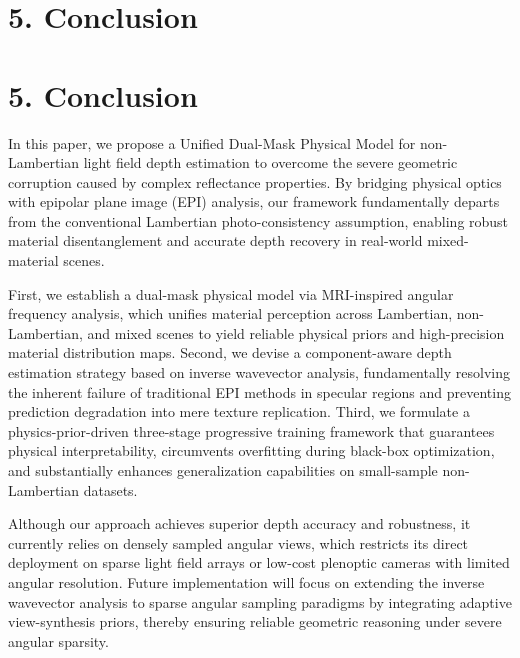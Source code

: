 \section{5. Conclusion}

\section{5. Conclusion}

In this paper, we propose a Unified Dual-Mask Physical Model for non-Lambertian light field depth estimation to overcome the severe geometric corruption caused by complex reflectance properties. By bridging physical optics with epipolar plane image (EPI) analysis, our framework fundamentally departs from the conventional Lambertian photo-consistency assumption, enabling robust material disentanglement and accurate depth recovery in real-world mixed-material scenes. 

First, we establish a dual-mask physical model via MRI-inspired angular frequency analysis, which unifies material perception across Lambertian, non-Lambertian, and mixed scenes to yield reliable physical priors and high-precision material distribution maps. Second, we devise a component-aware depth estimation strategy based on inverse wavevector analysis, fundamentally resolving the inherent failure of traditional EPI methods in specular regions and preventing prediction degradation into mere texture replication. Third, we formulate a physics-prior-driven three-stage progressive training framework that guarantees physical interpretability, circumvents overfitting during black-box optimization, and substantially enhances generalization capabilities on small-sample non-Lambertian datasets. 

Although our approach achieves superior depth accuracy and robustness, it currently relies on densely sampled angular views, which restricts its direct deployment on sparse light field arrays or low-cost plenoptic cameras with limited angular resolution. Future implementation will focus on extending the inverse wavevector analysis to sparse angular sampling paradigms by integrating adaptive view-synthesis priors, thereby ensuring reliable geometric reasoning under severe angular sparsity.
